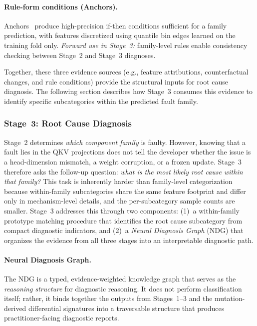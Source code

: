 \paragraph{Rule-form conditions (Anchors).}
Anchors~\cite{ribeiro2018anchors} produce high-precision if-then conditions sufficient for a family prediction, with features discretized using quantile bin edges learned on the training fold only. \textit{Forward use in Stage~3:} family-level rules enable consistency checking between Stage~2 and Stage~3 diagnoses.

Together, these three evidence sources (e.g., feature attributions, counterfactual changes, and rule conditions) provide the structural inputs for root cause diagnosis. The following section describes how Stage~3 consumes this evidence to identify specific subcategories within the predicted fault family.

\subsubsection{Stage~3: Root Cause Diagnosis}
\label{sec:defaultpp_rootcause}

Stage~2 determines \emph{which component family} is faulty. However, knowing that a fault lies in the QKV projections does not tell the developer whether the issue is a head-dimension mismatch, a weight corruption, or a frozen update. Stage~3 therefore asks the follow-up question: \emph{what is the most likely root cause within that family?} This task is inherently harder than family-level categorization because within-family subcategories share the same feature footprint and differ only in mechanism-level details, and the per-subcategory sample counts are smaller. Stage~3 addresses this through two components: (1)~a within-family prototype matching procedure that identifies the root cause subcategory from compact diagnostic indicators, and (2)~a \emph{Neural Diagnosis Graph} (NDG) that organizes the evidence from all three stages into an interpretable diagnostic path.

\paragraph{Neural Diagnosis Graph.}
The NDG is a typed, evidence-weighted knowledge graph that serves as the \emph{reasoning structure} for diagnostic reasoning. It does not perform classification itself; rather, it binds together the outputs from Stages~1--3 and the mutation-derived differential signatures into a traversable structure that produces practitioner-facing diagnostic reports.

